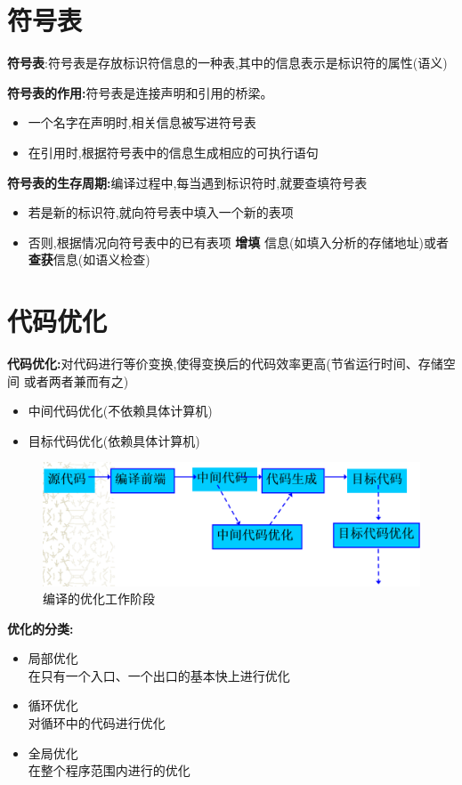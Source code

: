 \documentclass[UTF8,a4paper]{ctexart}
\begin{document}
\section{符号表}
\textbf{符号表}:符号表是存放标识符信息的一种表,其中的信息表示是标识符的属性(语义)

\textbf{符号表的作用:}符号表是连接声明和引用的桥梁。
\begin{itemize}
 \item 一个名字在声明时,相关信息被写进符号表
 \item 在引用时,根据符号表中的信息生成相应的可执行语句
\end{itemize}

\textbf{符号表的生存周期:}编译过程中,每当遇到标识符时,就要查填符号表
\begin{itemize}
 \item 若是新的标识符,就向符号表中填入一个新的表项
 \item 否则,根据情况向符号表中的已有表项 \textbf{增填} 信息(如填入分析的存储地址)或者 \textbf{查获}信息(如语义检查)

\end{itemize}

\section{代码优化}
\textbf{代码优化:}对代码进行等价变换,使得变换后的代码效率更高(节省运行时间、存储空间 或者两者兼而有之)

\begin{itemize}
 \item 中间代码优化(不依赖具体计算机)
 \item 目标代码优化(依赖具体计算机)
\end{itemize}

\begin{figure}[H]
 \centering
 \includegraphics[scale = 0.3]{assets/CompilerConstructionPrinciples_9646f.png}
 \caption{编译的优化工作阶段}
\end{figure}

\textbf{优化的分类:}
\begin{itemize}
 \item 局部优化\\
       在只有一个入口、一个出口的基本快上进行优化
 \item 循环优化\\
       对循环中的代码进行优化
 \item 全局优化\\
       在整个程序范围内进行的优化
\end{itemize}
\end{document}
